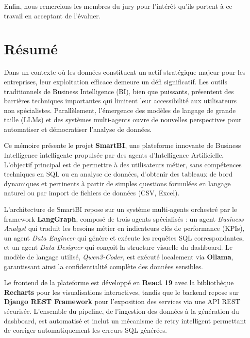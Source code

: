 \documentclass{rapportENSIAS}
\begin{document}
Enfin, nous remercions les membres du jury pour l'intérêt qu'ils portent à ce travail en acceptant de l'évaluer.

\chapter*{Résumé}

Dans un contexte où les données constituent un actif stratégique majeur pour les entreprises, leur exploitation efficace demeure un défi significatif. Les outils traditionnels de Business Intelligence (BI), bien que puissants, présentent des barrières techniques importantes qui limitent leur accessibilité aux utilisateurs non spécialistes. Parallèlement, l'émergence des modèles de langage de grande taille (LLMs) et des systèmes multi-agents ouvre de nouvelles perspectives pour automatiser et démocratiser l'analyse de données.

Ce mémoire présente le projet \textbf{SmartBI}, une plateforme innovante de Business Intelligence intelligente propulsée par des agents d'Intelligence Artificielle. L'objectif principal est de permettre à des utilisateurs métier, sans compétences techniques en SQL ou en analyse de données, d'obtenir des tableaux de bord dynamiques et pertinents à partir de simples questions formulées en langage naturel ou par import de fichiers de données (CSV, Excel).

L'architecture de SmartBI repose sur un système multi-agents orchestré par le framework \textbf{LangGraph}, composé de trois agents spécialisés : un agent \textit{Business Analyst} qui traduit les besoins métier en indicateurs clés de performance (KPIs), un agent \textit{Data Engineer} qui génère et exécute les requêtes SQL correspondantes, et un agent \textit{Data Designer} qui conçoit la structure visuelle du dashboard. Le modèle de langage utilisé, \textit{Qwen3-Coder}, est exécuté localement via \textbf{Ollama}, garantissant ainsi la confidentialité complète des données sensibles.

Le frontend de la plateforme est développé en \textbf{React 19} avec la bibliothèque \textbf{Recharts} pour les visualisations interactives, tandis que le backend repose sur \textbf{Django REST Framework} pour l'exposition des services via une API REST sécurisée. L'ensemble du pipeline, de l'ingestion des données à la génération du dashboard, est automatisé et inclut un mécanisme de retry intelligent permettant de corriger automatiquement les erreurs SQL générées.
\end{document}
